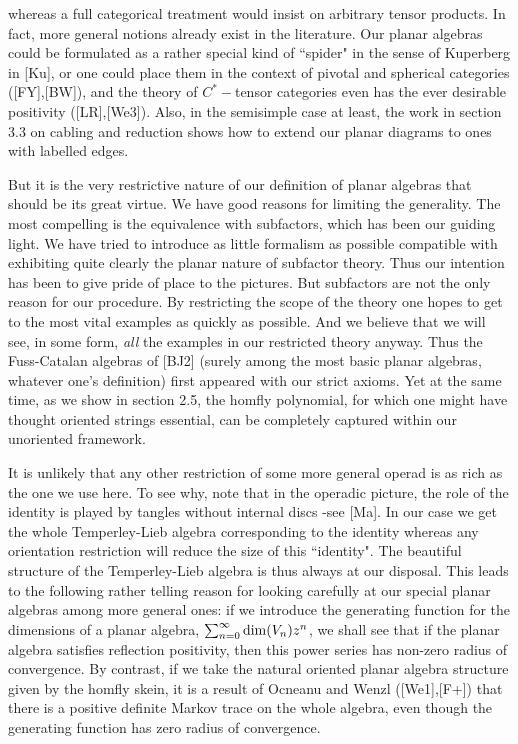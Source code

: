 whereas a full categorical treatment would insist on
arbitrary tensor products. In fact, more general notions
already exist in the literature. Our planar algebras could
be formulated as a rather special kind of ``spider" in
the sense of Kuperberg in [Ku], or one could place them in
the context of pivotal and spherical categories ([FY],[BW]), 
and the theory of $C^*-$tensor categories even has the 
ever desirable positivity ([LR],[We3]). Also, in the semisimple
case at least, the work in section 3.3 on cabling and reduction 
shows how to extend our planar diagrams to ones with labelled
edges.

But it is the very restrictive nature of our definition of planar
algebras that should be its great virtue. We have good reasons
for limiting the generality. The most compelling is the 
equivalence with subfactors, which has been our guiding light.
We have tried to introduce as little formalism as possible
compatible with exhibiting quite clearly the planar nature of
subfactor theory. Thus our intention has been to give pride
of place to the pictures. But subfactors are not the only
reason for our procedure. By restricting the scope of the theory
one hopes to get to the most vital examples as quickly as
possible. And we believe that we will see, in some form,
{\it all} the examples in our restricted theory anyway. 
Thus the Fuss-Catalan algebras of [BJ2] (surely among the 
most basic planar algebras, whatever one's definition)
first appeared with our strict axioms. Yet at the same time,
as we show in section 2.5, the {\sc homfly} polynomial, for
which one might have thought oriented strings essential, can
be completely captured within our unoriented framework.

It is unlikely that any other restriction of some more general
operad is as rich as the one we use here. To see why, note that 
in the operadic picture, the role of the identity is played by 
tangles without internal discs -see [Ma]. In our case we get the
whole Temperley-Lieb algebra corresponding to the identity 
whereas any orientation restriction will reduce the size of
this ``identity". The beautiful structure of the Temperley-Lieb
algebra is thus always at our disposal. This leads to the 
following rather telling reason for looking carefully 
at our special planar algebras among more general ones:
if we introduce the generating function for the dimensions
of a planar algebra,  $\sum^\infty_{n=0}\dim (V_n)z^n$,
we shall see that if the planar algebra satisfies reflection 
positivity, then this power series has non-zero radius of
convergence. By contrast, if we take the natural oriented planar
algebra structure given by the {\sc homfly} skein, it is a 
result of Ocneanu and Wenzl ([We1],[F+]) that there is a positive
definite Markov trace on the whole algebra, even though the
generating function has zero radius of convergence.

